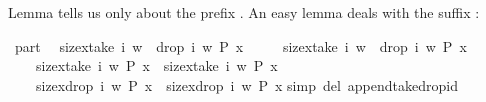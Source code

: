 \begin{isabellebody}
\begin{isamarkuptext}
Lemma  tells us only about the prefix .
An easy lemma deals with the suffix :%
\end{isamarkuptext}%
\isamarkuptrue%
\isamarkupfalse%
\ part{}{}\isanewline
\ \ {}{}size{}x{}take\ i\ w\ {}\ drop\ i\ w{}\ P\ x{}\ {}\isanewline
\ \ \ \ size{}x{}take\ i\ w\ {}\ drop\ i\ w{}\ {}P\ x{}{}{}{}\isanewline
\ \ \ \ size{}x{}take\ i\ w{}\ P\ x{}\ {}\ size{}x{}take\ i\ w{}\ {}P\ x{}{}{}{}\isanewline
\ \ \ {}\ size{}x{}drop\ i\ w{}\ P\ x{}\ {}\ size{}x{}drop\ i\ w{}\ {}P\ x{}{}{}{}\isanewline
%
\isadelimproof
%
\endisadelimproof
%
\isatagproof
{}\isamarkupfalse%
{}simp\ del{}\ append{}take{}drop{}id{}%
\endisatagproof
{\isafoldproof}%
%
\isadelimproof
%
\endisadelimproof

\end{isabellebody}

